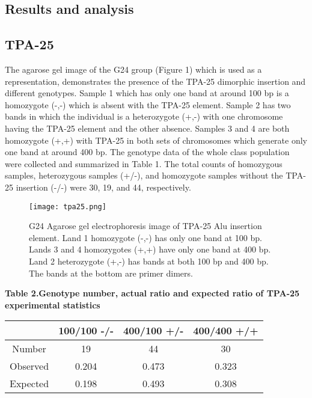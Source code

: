 \documentclass[a4paper,10pt]{article}
\begin{document}
\begin{multicols}{2}




\section{Results and analysis}
\subsection{TPA-25}
The agarose gel image of the G24 group (Figure 1) which is used as a representation, demonstrates the presence of the TPA-25 dimorphic insertion and different genotypes. Sample 1 which has only one band at around 100 bp is a homozygote (-,-) which is absent with the TPA-25 element. Sample 2 has two bands in which the individual is a heterozygote (+,-) with one chromosome having the TPA-25 element and the other absence. Samples 3 and 4 are both homozygote (+,+) with TPA-25 in both sets of chromosomes which generate only one band at around 400 bp. The genotype data of the whole class population were collected and summarized in Table 1. The total counts of homozygous samples, heterozygous samples (+/-), and homozygote samples without the TPA-25 insertion (-/-) were 30, 19, and 44, respectively.

\begin{figure}[H]
\centering
\texttt{[image: tpa25.png]}
\caption{G24 Agarose gel electrophoresis image of TPA-25 Alu insertion element. Land 1 homozygote (-,-) has only one band at 100 bp. Lands 3 and 4 homozygotes (+,+) have only one band at 400 bp. Land 2 heterozygote (+,-) has bands at both 100 bp and 400 bp. The bands at the bottom are primer dimers.} \label{fig1}
\end{figure}


\begin{center}
\textbf{Table 2.Genotype number, actual ratio and expected ratio of TPA-25 experimental statistics}
\vspace{0pt}
\begin{tabular}{cccc}

\toprule [1.5pt]
&100/100 -/-&400/100 +/-&400/400 +/+\\
\hline
Number&19&44&30\\
Observed&0.204&0.473&0.323\\
Expected&0.198&0.493&0.308\\
\bottomrule [1.5pt]
\end{tabular}
\end{center}




\end{multicols}
\end{document}
